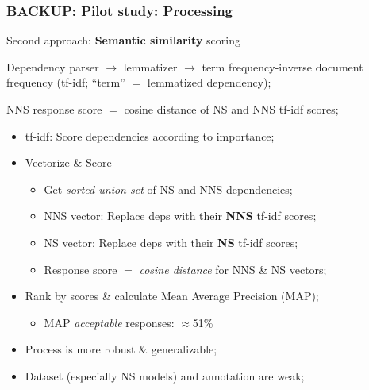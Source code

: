\documentclass[handout,xcolor={dvipsnames}]{beamer}
\begin{document}
\begin{frame}
\frametitle{BACKUP: Pilot study: Processing}
Second approach: \textbf{Semantic similarity} scoring

\medskip
\pause
Dependency parser $\rightarrow$ lemmatizer $\rightarrow$ term frequency-inverse document frequency (tf-idf; ``term'' $=$ lemmatized dependency);

\pause
\medskip
NNS response score $=$ cosine distance of NS and NNS tf-idf scores;
\pause

\begin{itemize}
\pause
\item tf-idf: Score dependencies according to importance; 
\pause
\item Vectorize \& Score
\begin{itemize}
\pause
\item Get \textit{sorted union set} of NS and NNS dependencies;
\pause
\item NNS vector: Replace deps with their \textbf{NNS} tf-idf scores;
\pause
\item NS vector: Replace deps with their \textbf{NS} tf-idf scores;
\pause
\item Response score $=$ \textit{cosine distance} for NNS \& NS vectors;
\end{itemize}
\pause
\item Rank by scores \& calculate Mean Average Precision (MAP);
\begin{itemize}
\pause
\item MAP \textit{acceptable} responses: $\approx$51\%
\end{itemize}
\pause
\item Process is more robust \& generalizable;
\pause
\item Dataset (especially NS models) and annotation are weak;
\end{itemize}
\end{frame}
\end{document}
